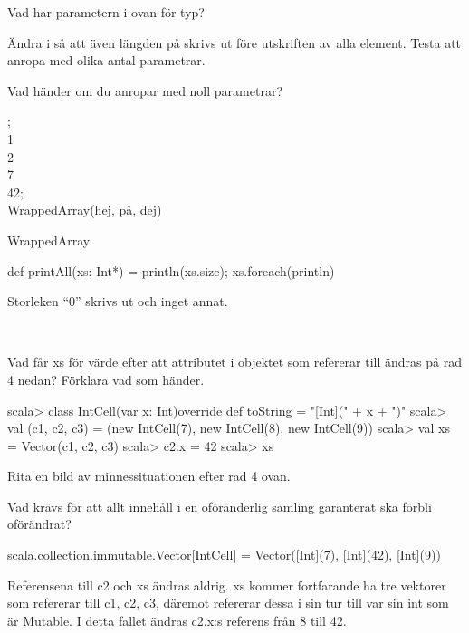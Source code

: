 \Subtask Vad har parametern  i  ovan för typ?

\Subtask Ändra i  så att även längden på  skrivs ut före utskriften av alla element. Testa att anropa  med olika antal parametrar.

\Subtask Vad händer om du anropar  med noll parametrar?

\SOLUTION


\TaskSolved \what


;\\
 1\\
 2\\
 7\\
 42;\\
 WrappedArray(hej, på, dej)

\SubtaskSolved  WrappedArray

\SubtaskSolved  def printAll(xs: Int*) = {println(xs.size); xs.foreach(println)}

\SubtaskSolved  Storleken “0” skrivs ut och inget annat.




\QUESTEND









\QUESTBEGIN

\Task  \what~

\Subtask Vad får xs för värde efter att attributet i objektet som  refererar till ändras på rad 4 nedan? Förklara vad som händer.
\begin{REPL}
scala> class IntCell(var x: Int){override def toString = "[Int](" + x + ")"}
scala> val (c1, c2, c3) = (new IntCell(7), new IntCell(8), new IntCell(9))
scala> val xs = Vector(c1, c2, c3)
scala> c2.x = 42
scala> xs
\end{REPL}

\Subtask\Pen Rita en bild av minnessituationen efter rad 4 ovan.

\Subtask\Pen Vad krävs för att allt innehåll i en oföränderlig samling garanterat ska förbli oförändrat?

\SOLUTION


\TaskSolved \what


\SubtaskSolved  \begin{REPL}
scala.collection.immutable.Vector[IntCell] =
    Vector([Int](7), [Int](42), [Int](9))
\end{REPL}
Referensena till c2 och xs ändras aldrig.
xs kommer fortfarande ha tre vektorer som refererar till c1, c2, c3, däremot refererar dessa i sin tur till var sin int som är Mutable.
I detta fallet ändras c2.x:s referens från 8 till 42.

